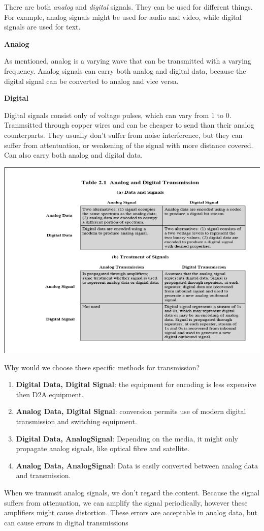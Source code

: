 \documentclass{article}
\begin{document}
There are both \textit{analog} and \textit{digital} signals. They can be used for different things. For example, analog signals might
be used for audio and video, while digital signals are used for text.

\hspace{10mm}\textbf{Analog}

As mentioned, analog is a varying wave that can be transmitted with a varying frequency. Analog signals can carry both analog and
digital data, because the digital signal can be converted to analog and vice versa.

\hspace{10mm}\textbf{Digital}

Digital signals consist only of voltage pulses, which can vary from 1 to 0. Tranmsitted through copper wires and can be cheaper 
to send than their analog counterparts. They usually don't suffer from noise interference, but they can suffer from attentuation,
or weakening of the signal with more distance covered. Can also carry both analog and digital data.

\includegraphics[scale=.25]{signals}

Why would we choose these specific methods for transmission?
\begin{enumerate}
		\item{\textbf{Digital Data, Digital Signal}}: the equipment for encoding is less expensive then D2A equipment.
		\item{\textbf{Analog Data, Digital Signal}}: conversion permits use of modern digital transmission and switching equipment.
		\item{\textbf{Digital Data, AnalogSignal}}: Depending on the media, it might only propagate analog signals, like optical 
			fibre and satellite.
		\item{\textbf{Analog Data, AnalogSignal}}: Data is easily converted between analog data and transmission.
\end{enumerate}
When we tranmsit analog signals, we don't regard the content. Because the signal suffers from attenuation, we can amplify the 
signal periodically, however these amplifiers might cause distortion. These errors are acceptable in analog data, but can cause
errors in digital transmissions
\end{document}
